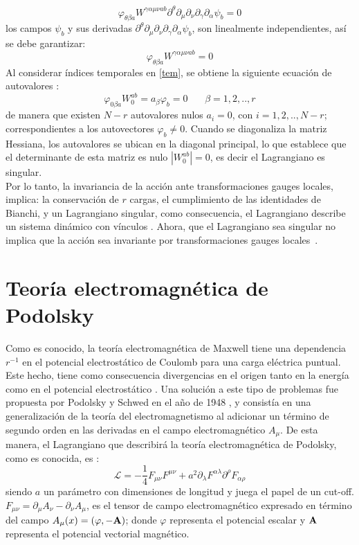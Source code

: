 \documentclass[a4paper,12pt]{article}
\begin{document}
\begin{equation}
\varphi_{\theta\beta a}W^{\gamma\alpha\mu\nu ab}\partial^\theta\partial_\mu\partial_\nu\partial_\gamma\partial_\alpha\psi_b=0 
\end{equation}
los campos $\psi_b$ y sus derivadas $\partial^\theta\partial_\mu\partial_\nu\partial_\gamma\partial_\alpha\psi_b$, son linealmente independientes, así se debe garantizar:
\begin{equation}
\varphi_{\theta\beta a}W^{\gamma\alpha\mu\nu ab}=0 
\label{tem}
\end{equation}
Al considerar índices temporales en \eqref{tem}, se obtiene la siguiente ecuación de autovalores \cite{vinculos}:
\begin{equation}
\varphi_{0\beta a}W^{ab}_0=a_\beta\varphi_{b}=0 \ \ \ \  \ \ \ \ \beta=1,2,..,r
\label{auto}
\end{equation}
de manera que existen $N-r$ autovalores nulos $a_i=0$, con $i=1,2,..,N-r$; correspondientes a los autovectores $\varphi_{b}\neq0$. Cuando se diagonaliza la matriz Hessiana, los autovalores se ubican en la diagonal principal, lo que establece que el determinante de esta matriz es nulo $|W^{ab}_0| =0$, es decir el Lagrangiano es singular.
\\

Por lo tanto, la invariancia de la acción ante transformaciones gauges locales, implica: la conservación de $r$ cargas, el cumplimiento de las identidades de Bianchi, y un Lagrangiano singular, como consecuencia, el Lagrangiano describe un sistema dinámico con vínculos \cite{vinculos,local}. Ahora, que el \mbox{Lagrangiano} sea \mbox{singular} no implica que la acción sea invariante por \mbox{transformaciones} gauges \mbox{locales \cite{vinculos}.} 
\newpage
\section{Teoría electromagnética de Podolsky}
Como es conocido, la teoría electromagnética de Maxwell tiene una \mbox{dependencia $r^{-1}$} en el potencial electrostático de Coulomb para una carga eléctrica puntual. Este hecho, tiene como consecuencia divergencias en el origen tanto en la energía como en el potencial electrostático \cite{elec}. Una solución a este tipo de problemas fue propuesta por Podolsky y Schwed en el año de 1948 \cite{podol}, y consistía en una generalización de la teoría del electromagnetismo al adicionar un término de segundo orden en las derivadas en el campo electromagnético  $A_\mu$. De esta manera, el Lagrangiano que describirá la teoría electromagnética de Podolsky, como es conocida, es \cite{podolsky}:
\begin{equation}
\mathscr{L}=-\frac{1}{4} F_{\mu \nu}F^{\mu \nu}+a^2\partial_\lambda F^{\alpha\lambda}\partial^\rho F_{\alpha\rho} 
\label{lapodol} 
\end{equation}   
siendo $a$ un parámetro con dimensiones de longitud y juega el papel de un cut-off. $F_{\mu \nu}=\partial_\mu A_\nu-\partial_\nu A_\mu$, es el tensor de campo electromagnético expresado en término del campo $A_\mu(x)=(\varphi,-{\bf A})$; donde $\varphi$ representa el potencial \mbox{escalar} y ${\bf A}$ representa el potencial vectorial magnético.
\\ 
\end{document}
